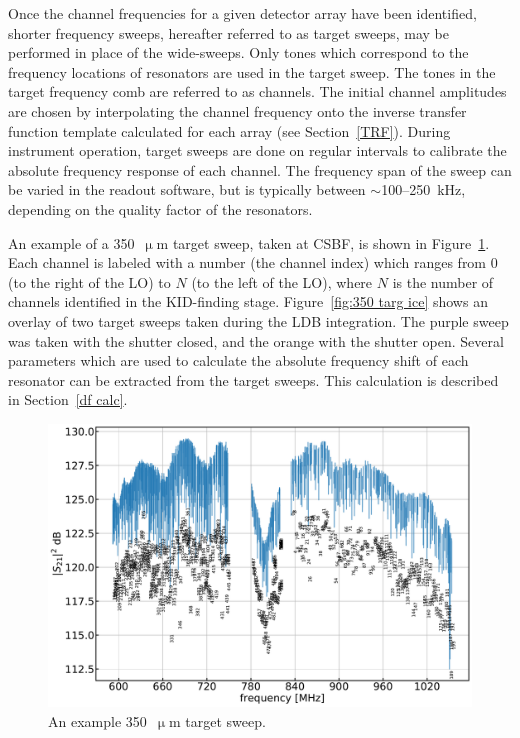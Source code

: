 Once the channel frequencies for a given detector array have been identified, shorter frequency sweeps, hereafter referred to as target sweeps, may be performed in place of the wide-sweeps. Only tones which correspond to the frequency locations of resonators are used in the target sweep. The tones in the target frequency comb are referred to as channels. The initial channel amplitudes are chosen by interpolating the channel frequency onto the inverse transfer function template calculated for each array (see Section~\ref{TRF}). During instrument operation, target sweeps are done on regular intervals to calibrate the absolute frequency response of each channel. The frequency span of the sweep can be varied in the readout software, but is typically between $\sim$100--250~kHz, depending on the quality factor of the resonators.

An example of a 350~$\upmu$m target sweep, taken at CSBF, is shown in Figure~\ref{fig:350 targ fts}. Each channel is labeled with a number (the channel index) which ranges from 0 (to the right of the LO) to $N$ (to the left of the LO), where $N$ is the number of channels identified in the KID-finding stage. Figure~\ref{fig:350 targ ice} shows an overlay of two target sweeps taken during the LDB integration. The purple sweep was taken with the shutter closed, and the orange with the shutter open. Several parameters which are used to calculate the absolute frequency shift of each resonator can be extracted from the target sweeps. This calculation is described in Section~\ref{df calc}.

\begin{figure}[!htbp]
\centering
\includegraphics[width=\textwidth]{figures/blast_data/sweeps/350_targ_fts}
\caption[~An example  target sweep.]{An example 350~$\upmu$m target sweep.}
\label{fig:350 targ fts}
\end{figure}

